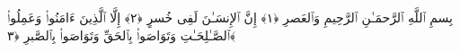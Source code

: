 
  
    
  
    
    

\nopagebreak
  بِسمِ ٱللَّهِ ٱلرَّحمَـٰنِ ٱلرَّحِيمِ
  وَٱلعَصرِ ﴿١﴾
إِنَّ ٱلإِنسَـٰنَ لَفِى خُسرٍ ﴿٢﴾
 إِلَّا ٱلَّذِينَ ءَامَنُوا۟ وَعَمِلُوا۟ ٱلصَّـٰلِحَـٰتِ وَتَوَاصَوا۟ بِٱلحَقِّ وَتَوَاصَوا۟ بِٱلصَّبرِ ﴿٣﴾
 
